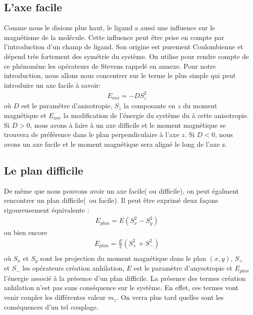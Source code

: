 \subsection{L'axe facile}
Comme nous le disions plus haut, le ligand a aussi une influence sur le magnétisme de la molécule. Cette influence peut \^etre prise en compte par l'introduction d'un champ de ligand. Son origine est purement Coulombienne
 et dépend très fortement des symétrie du système. On utilise pour rendre compte de ce phénomène les opérateurs de Stevens rappelé en annexe. Pour notre introduction, nous allons nous concentrer sur le terme le plus simple qui peut introduire un axe facile à savoir:
 \begin{eqnarray}
E_{ani} = -DS_z^2 \nonumber
\end{eqnarray}
où $D$ est le paramètre d'anisotropie, $S_z$ la composante en $z$ du moment magnétique et $E_{ani}$ la modification de l'énergie du système du à cette anisotropie. Si $D>0$, nous avons à faire à un axe difficile et le moment magnétique se trouvera de préférence dans le plan perpendiculaire à l'axe $z$. Si $D<0$, nous avons un axe facile et le moment magnétique sera aligné le long de l'axe z.

\subsection{Le plan difficile}
De m\^eme que nous pouvons avoir un axe facile( ou difficile), on peut égalment rencontrer un plan difficile(~ou facile). Il peut \^etre exprimé deux façons rigoureusement équivalente :
\begin{eqnarray}
E_{plan} = E ( S_x^2 -S_y^2) \nonumber
\end{eqnarray}
ou bien encore
\begin{eqnarray}
E_{plan} = \frac{E}{2} ( S_+^2  + S_-^2) \nonumber \\
\end{eqnarray}
où $S_x$ et $S_y$ sont les projection du moment magnétique dans le plan $(x,y)$, $S_+$ et $S_-$ les opérateurs création anhilation, $E$ est le paramètre d'anysotropie et $E_{plan}$ l'énergie associé à la présence d'un plan difficile. La présence des termes création anhilation n'est pas sans conséquence sur le système. En effet, ces termes vont venir coupler les différentes valeur $m_z$. On verra plus tard quelles sont les conséquences d'un tel couplage.

